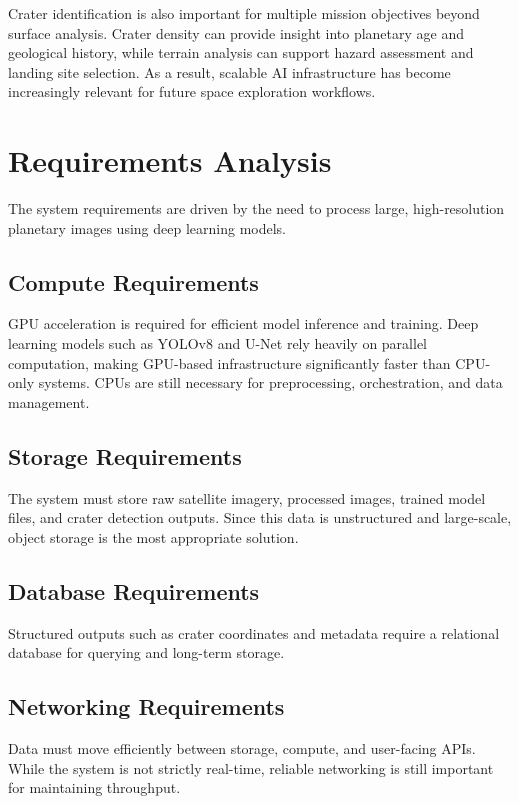 \documentclass[conference]{IEEEtran}
\begin{document}
	Crater identification is also important for multiple mission objectives beyond surface analysis. Crater density can provide insight into planetary age and geological history, while terrain analysis can support hazard assessment and landing site selection. As a result, scalable AI infrastructure has become increasingly relevant for future space exploration workflows.
	
	\section{Requirements Analysis}
	
	The system requirements are driven by the need to process large, high-resolution planetary images using deep learning models.
	
	\subsection{Compute Requirements}
	
	GPU acceleration is required for efficient model inference and training. Deep learning models such as YOLOv8 and U-Net rely heavily on parallel computation, making GPU-based infrastructure significantly faster than CPU-only systems. CPUs are still necessary for preprocessing, orchestration, and data management.
	
	\subsection{Storage Requirements}
	
	The system must store raw satellite imagery, processed images, trained model files, and crater detection outputs. Since this data is unstructured and large-scale, object storage is the most appropriate solution.
	
	\subsection{Database Requirements}
	
	Structured outputs such as crater coordinates and metadata require a relational database for querying and long-term storage.
	
	\subsection{Networking Requirements}
	
	Data must move efficiently between storage, compute, and user-facing APIs. While the system is not strictly real-time, reliable networking is still important for maintaining throughput.
	
\end{document}
